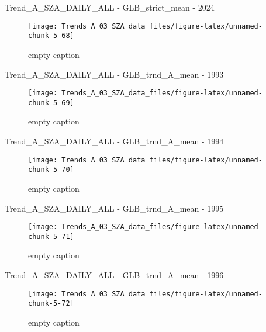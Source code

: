 \documentclass[
  10pt,
  a4paper,oneside]{article}
\begin{document}
Trend\_A\_SZA\_DAILY\_ALL - GLB\_strict\_mean - 2024

\begin{figure}[!ht]

{\centering \texttt{[image: Trends\_A\_03\_SZA\_data\_files/figure-latex/unnamed-chunk-5-68]} 

}

\caption{ empty caption }\label{fig:unnamed-chunk-5-68}
\end{figure}

Trend\_A\_SZA\_DAILY\_ALL - GLB\_trnd\_A\_mean - 1993

\begin{figure}[!ht]

{\centering \texttt{[image: Trends\_A\_03\_SZA\_data\_files/figure-latex/unnamed-chunk-5-69]} 

}

\caption{ empty caption }\label{fig:unnamed-chunk-5-69}
\end{figure}

Trend\_A\_SZA\_DAILY\_ALL - GLB\_trnd\_A\_mean - 1994

\begin{figure}[!ht]

{\centering \texttt{[image: Trends\_A\_03\_SZA\_data\_files/figure-latex/unnamed-chunk-5-70]} 

}

\caption{ empty caption }\label{fig:unnamed-chunk-5-70}
\end{figure}

Trend\_A\_SZA\_DAILY\_ALL - GLB\_trnd\_A\_mean - 1995

\begin{figure}[!ht]

{\centering \texttt{[image: Trends\_A\_03\_SZA\_data\_files/figure-latex/unnamed-chunk-5-71]} 

}

\caption{ empty caption }\label{fig:unnamed-chunk-5-71}
\end{figure}

Trend\_A\_SZA\_DAILY\_ALL - GLB\_trnd\_A\_mean - 1996

\begin{figure}[!ht]

{\centering \texttt{[image: Trends\_A\_03\_SZA\_data\_files/figure-latex/unnamed-chunk-5-72]} 

}

\caption{ empty caption }\label{fig:unnamed-chunk-5-72}
\end{figure}
\end{document}
